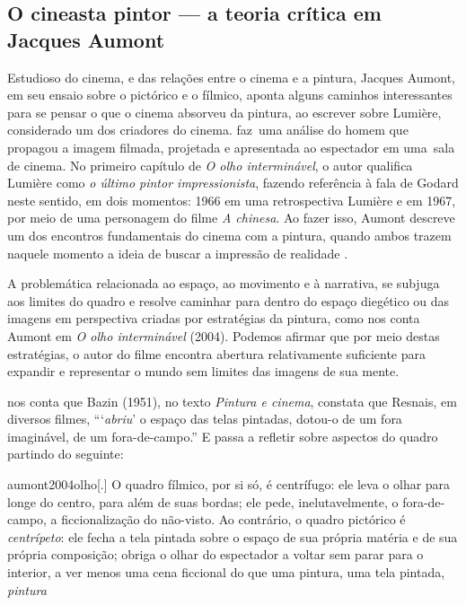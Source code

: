 \subsection{O cineasta pintor --- a teoria crítica em Jacques Aumont}%
\label{o-cineasta-pintor-a-teoria-cruxedtica-em-jacques-aumont}

Estudioso do cinema, e das relações entre o cinema e a pintura, Jacques
Aumont, em seu ensaio sobre o pictórico e o fílmico, aponta alguns
caminhos interessantes para se pensar o que o cinema absorveu da
pintura, ao escrever sobre Lumière, considerado um dos criadores do
cinema. \citeauthor{aumont2004olho} faz~uma análise do homem que propagou a imagem filmada,
projetada e apresentada ao espectador em uma~sala de cinema. No
primeiro capítulo de \emph{O olho interminável}, o autor qualifica
Lumière como \emph{o último pintor impressionista}, fazendo referência
à fala de Godard neste sentido, em dois momentos: 1966 em uma
retrospectiva Lumière e em 1967, por meio de uma personagem do filme
\emph{A chinesa}. Ao fazer isso, Aumont descreve um dos encontros
fundamentais do cinema com a pintura, quando ambos trazem naquele
momento a ideia de buscar a impressão de realidade \parencite[27]{aumont2004olho}.

A problemática relacionada ao espaço, ao movimento e à narrativa, se
subjuga aos limites do quadro e resolve caminhar para dentro do espaço
diegético ou das imagens em perspectiva criadas por estratégias da
pintura, como nos conta Aumont em \emph{O olho interminável} (2004).
Podemos afirmar que por meio destas estratégias, o autor do filme
encontra abertura relativamente suficiente para expandir e representar
o mundo sem limites das imagens de sua mente.

\textcite{aumont2004olho} nos conta que Bazin (1951), no texto \emph{Pintura e
	cinema}, constata que Resnais, em diversos filmes,
\enquote{\enquote{\emph{abriu}} o espaço das telas pintadas, dotou-o de
	um fora imaginável, de um fora-de-campo.} E passa a refletir sobre
aspectos do quadro partindo do seguinte:

\begin{displaycquote}[142]{aumont2004olho}[.]
	O quadro fílmico, por si só, é centrífugo: ele leva o olhar para longe
	do centro, para além de suas bordas; ele pede, inelutavelmente, o
	fora-de-campo, a ficcionalização do não-visto. Ao contrário, o quadro
	pictórico é \emph{centrípeto}: ele fecha a tela pintada sobre o espaço
	de sua própria matéria e de sua própria composição; obriga o olhar do
	espectador a voltar sem parar para o interior, a ver menos uma cena
	ficcional do que uma pintura, uma tela pintada, \emph{pintura}
\end{displaycquote}

